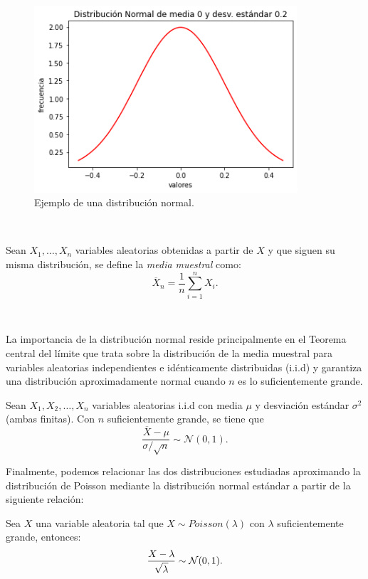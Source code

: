 \documentclass[oneside,openright,titlepage,numbers=noenddot,openany,headinclude,footinclude=true,
cleardoublepage=empty,abstractoff,BCOR=5mm,paper=a4,fontsize=12pt,main=spanish]{scrreprt}
\begin{document}
\begin{figure}[h]
	\centering
	\includegraphics[width=9.8cm]{distnormal.png}
	\caption{Ejemplo de una distribución normal.}
    \label{fig:distrnormal}
\end{figure}\

\begin{definition}
Sean $X_1,\dots,X_n$ variables aleatorias obtenidas a partir de $X$ y que siguen su misma distribución, se define la \textit{media muestral} como:
$$\overline{X}_n=\frac{1}{n}\sum_{i=1}^n X_i.$$
\end{definition}\

La importancia de la distribución normal reside principalmente en el Teorema central del límite que trata sobre la distribución de la media muestral para variables aleatorias independientes e idénticamente distribuidas (i.i.d) y garantiza una distribución aproximadamente normal cuando $n$ es lo suficientemente grande.\\

\begin{theorem} \label{th:thcentral}
Sean $X_1,X_2,\dots,X_n$ variables aleatorias i.i.d con media $\mu$ y desviación estándar $\sigma^2$ (ambas finitas). Con $n$ suficientemente grande, se tiene que $$\frac{\overline{X}-\mu}{\sigma / \sqrt{n}}\sim \mathcal{N}(0,1).$$
\end{theorem}

\clearpage

Finalmente, podemos relacionar las dos distribuciones estudiadas aproximando la distribución de Poisson mediante la distribución normal estándar a partir de la siguiente relación:\\

\begin{proposition}
Sea $X$ una variable aleatoria tal que $X \sim Poisson(\lambda)$ con $\lambda$ suficientemente grande, entonces: $$\frac{\displaystyle X-\lambda}{\displaystyle \sqrt{\lambda}}\sim \mathcal{N}(0,1).$$
\end{proposition}\
\end{document}
